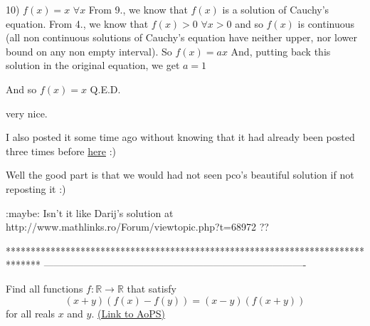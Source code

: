 \begin{mysolution}
10) $ f(x)=x$ $ \forall x$
From 9., we know that $ f(x)$ is a solution of Cauchy's equation.
From 4., we know that $ f(x)>0$ $ \forall x>0$ and so $ f(x)$ is continuous (all non continuous solutions of Cauchy's equation have neither upper, nor lower bound on any non empty interval).
So $ f(x)=ax$
And, putting back this solution in the original equation, we get $ a=1$

And so $ f(x)=x$
Q.E.D.
\end{mysolution}



\begin{mysolution}
	very nice.
\end{mysolution}



\begin{mysolution}
	I also posted it some time ago without knowing that it had already been posted three times before
\href{http://www.mathlinks.ro/viewtopic.php?search_id=1056481267&t=75846}{here}
 :)
\end{mysolution}



\begin{mysolution}
	Well the good part is that we would had not seen pco's beautiful solution if not reposting it  :)
\end{mysolution}



\begin{mysolution}
	:maybe: 
Isn't it like Darij's solution at http://www.mathlinks.ro/Forum/viewtopic.php?t=68972 ??
\end{mysolution}
*******************************************************************************
-------------------------------------------------------------------------------

\begin{problem}
	Find all functions $f: \mathbb R \to \mathbb R$ that satisfy
\[(x+y)(f(x)-f(y))=(x-y)(f(x+y))\]
for all reals $x$ and $y$.
	\flushright \href{https://artofproblemsolving.com/community/c6h161596}{(Link to AoPS)}
\end{problem}



